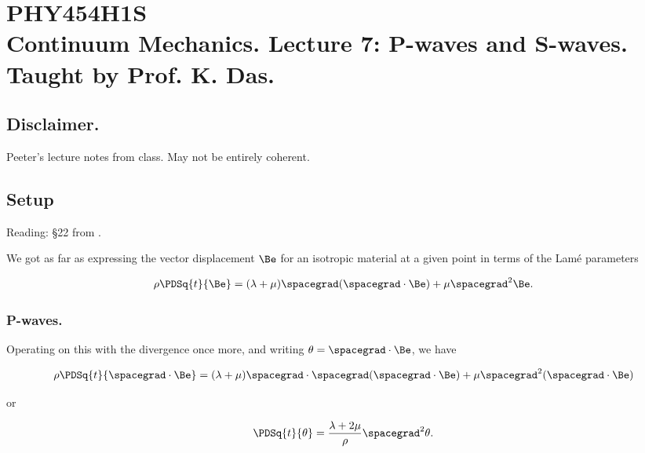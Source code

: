 
%

\chapter{PHY454H1S\\Continuum Mechanics.  Lecture 7: P-waves and S-waves.  Taught by Prof. K. Das.}
\label{chap:continuumL7}
{}
\date{Feb 1, 2012}

\beginArtWithToc

\section{Disclaimer.}

Peeter's lecture notes from class.  May not be entirely coherent.

\section{Setup}

Reading: \S 22 from \cite{landau1960theory}.

We got as far as expressing the vector displacement $\Be$ for an isotropic material at a given point in terms of the Lam\'e parameters

\begin{equation}\label{eqn:continuumL7:10}
\rho \PDSq{t}{\Be} = (\lambda + \mu) \spacegrad (\spacegrad \cdot \Be) + \mu \spacegrad^2 \Be.
\end{equation}

\subsection{P-waves.}

Operating on this with the divergence once more, and writing $\theta = \spacegrad \cdot \Be$, we have

\begin{equation}\label{eqn:continuumL7:30}
\rho \PDSq{t}{\spacegrad \cdot \Be} = (\lambda + \mu) \spacegrad \cdot \spacegrad (\spacegrad \cdot \Be) + \mu \spacegrad^2 (\spacegrad \cdot \Be)
\end{equation}

or

\begin{equation}\label{eqn:continuumL7:50}
\PDSq{t}{\theta} = \frac{\lambda + 2 \mu}{\rho} \spacegrad^2 \theta.
\end{equation}

